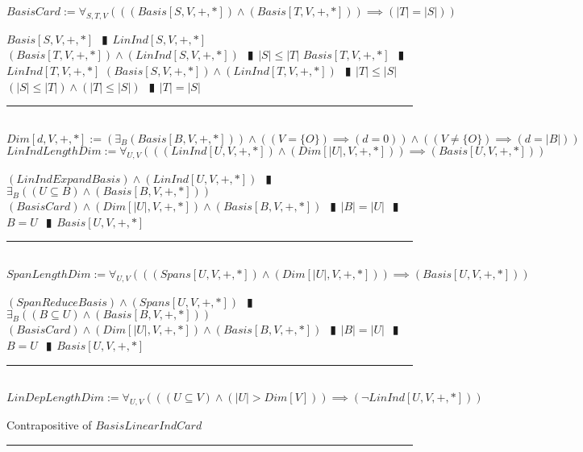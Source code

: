 \documentclass{book}
\newcommand{\abr}{:=}
\newcommand{\pipe}{$\phantom{(}\vrectangleblack\phantom{)}$}
\begin{document}
$BasisCard \abr \forall_{S, T, V}(((Basis[S, V, +, *]) \land (Basis[T, V, +, *])) \implies (|T| = |S|))$
\begin{enumerate}
  \lit $Basis[S, V, +, *]$ \pipe $LinInd[S, V, +, *]$
  \lit $(Basis[T, V, +, *]) \land (LinInd[S, V, +, *])$ \pipe $|S| \leq |T|$
  \lit $Basis[T, V, +, *]$ \pipe $LinInd[T, V, +, *]$
  \lit $(Basis[S, V, +, *]) \land (LinInd[T, V, +, *])$ \pipe $|T| \leq |S|$
  \lit $(|S| \leq |T|) \land (|T| \leq |S|)$ \pipe $|T| = |S|$
\end{enumerate} \vspace{.75mm} \hrule \vspace{.75mm} \ \\ 

$Dim[d, V, +, *] \abr (\exists_{B}(Basis[B, V, +, *])) \land ((V = \{O\}) \implies (d = 0)) \land  ((V \neq \{O\}) \implies (d = |B|))$ \\

$LinIndLengthDim \abr \forall_{U, V}(((LinInd[U, V, +, *]) \land (Dim[|U|, V, +, *])) \implies (Basis[U, V, +, *]))$
\begin{enumerate}
  \lit $(LinIndExpandBasis) \land (LinInd[U, V, +, *])$ \pipe $\exists_{B}((U \subseteq B) \land (Basis[B, V, +, *]))$
  \lit $(BasisCard) \land (Dim[|U|, V, +, *]) \land (Basis[B, V, +, *])$ \pipe $|B| = |U|$ \pipe $B = U$ \pipe $Basis[U, V, +, *]$
\end{enumerate} \vspace{.75mm} \hrule \vspace{.75mm} \ \\ 

$SpanLengthDim \abr \forall_{U, V}(((Spans[U, V, +, *]) \land (Dim[|U|, V, +, *])) \implies (Basis[U, V, +, *]))$
\begin{enumerate}
  \lit $(SpanReduceBasis) \land (Spans[U, V, +, *])$ \pipe $\exists_{B}((B \subseteq U) \land (Basis[B, V, +, *]))$
  \lit $(BasisCard) \land (Dim[|U|, V, +, *]) \land (Basis[B, V, +, *])$ \pipe $|B| = |U|$ \pipe $B = U$ \pipe $Basis[U, V, +, *]$
\end{enumerate} \vspace{.75mm} \hrule \vspace{.75mm} \ \\ 

$LinDepLengthDim \abr \forall_{U, V}(((U \subseteq V) \land (|U| > Dim[V])) \implies (\lnot LinInd[U, V, +, *]))$
\begin{enumerate}
  \lit Contrapositive of $BasisLinearIndCard$
\end{enumerate} \vspace{.75mm} \hrule \vspace{.75mm} \ \\ 
\end{document}
